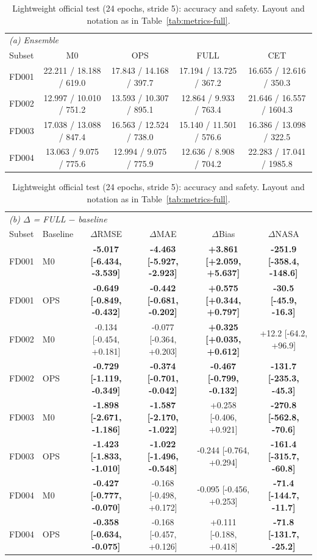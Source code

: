 \begin{table}[t]
\centering
\caption{Lightweight official test (24 epochs, stride 5): accuracy and safety. Layout and notation as in Table~\ref{tab:metrics-full}.}
\label{tab:metrics-light}
\small
\begin{tabular}{lcccc}
\toprule
\multicolumn{5}{l}{\textit{(a) Ensemble}} \\
Subset & M0 & OPS & FULL & CET \\
\midrule
FD001 & 22.211 / 18.188 / 619.0 & 17.843 / 14.168 / 397.7 & 17.194 / 13.725 / 367.2 & 16.655 / 12.616 / 350.3 \\
FD002 & 12.997 / 10.010 / 751.2 & 13.593 / 10.307 / 895.1 & 12.864 / 9.933 / 763.4 & 21.646 / 16.557 / 1604.3 \\
FD003 & 17.038 / 13.088 / 847.4 & 16.563 / 12.524 / 738.0 & 15.140 / 11.501 / 576.6 & 16.386 / 13.098 / 322.5 \\
FD004 & 13.063 / 9.075 / 775.6 & 12.994 / 9.075 / 775.9 & 12.636 / 8.908 / 704.2 & 22.283 / 17.041 / 1985.8 \\
\bottomrule
\end{tabular}

\vspace{4pt}
\begin{tabular}{llcccc}
\toprule
\multicolumn{6}{l}{\textit{(b) $\Delta$ = FULL $-$ baseline}} \\
Subset & Baseline & $\Delta$RMSE & $\Delta$MAE & $\Delta$Bias & $\Delta$NASA \\
\midrule
FD001 & M0 & \textbf{-5.017 [-6.434, -3.539]} & \textbf{-4.463 [-5.927, -2.923]} & \textbf{+3.861 [+2.059, +5.637]} & \textbf{-251.9 [-358.4, -148.6]} \\
FD001 & OPS & \textbf{-0.649 [-0.849, -0.432]} & \textbf{-0.442 [-0.681, -0.202]} & \textbf{+0.575 [+0.344, +0.797]} & \textbf{-30.5 [-45.9, -16.3]} \\
FD002 & M0 & -0.134 [-0.454, +0.181] & -0.077 [-0.364, +0.203] & \textbf{+0.325 [+0.035, +0.612]} & +12.2 [-64.2, +96.9] \\
FD002 & OPS & \textbf{-0.729 [-1.119, -0.349]} & \textbf{-0.374 [-0.701, -0.042]} & \textbf{-0.467 [-0.799, -0.132]} & \textbf{-131.7 [-235.3, -45.3]} \\
FD003 & M0 & \textbf{-1.898 [-2.671, -1.186]} & \textbf{-1.587 [-2.170, -1.022]} & +0.258 [-0.406, +0.921] & \textbf{-270.8 [-562.8, -70.6]} \\
FD003 & OPS & \textbf{-1.423 [-1.833, -1.010]} & \textbf{-1.022 [-1.496, -0.548]} & -0.244 [-0.764, +0.294] & \textbf{-161.4 [-315.7, -60.8]} \\
FD004 & M0 & \textbf{-0.427 [-0.777, -0.070]} & -0.168 [-0.498, +0.172] & -0.095 [-0.456, +0.253] & \textbf{-71.4 [-144.7, -11.7]} \\
FD004 & OPS & \textbf{-0.358 [-0.634, -0.075]} & -0.168 [-0.457, +0.126] & +0.111 [-0.188, +0.418] & \textbf{-71.8 [-131.7, -25.2]} \\
\bottomrule
\end{tabular}
\end{table}
